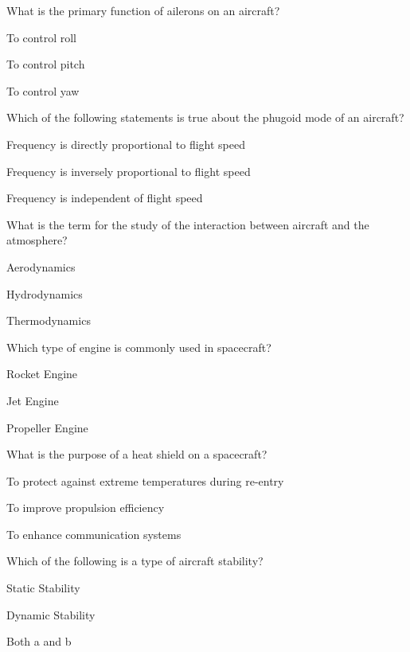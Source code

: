 \begin{enhancedmcq}{What is the primary function of ailerons on an aircraft?}
\item To control roll
\item To control pitch
\item To control yaw

\end{enhancedmcq}
\begin{enhancedmcq}{Which of the following statements is true about the phugoid mode of an aircraft?}
\item Frequency is directly proportional to flight speed
\item Frequency is inversely proportional to flight speed
\item Frequency is independent of flight speed

\end{enhancedmcq}
\begin{enhancedmcq}{What is the term for the study of the interaction between aircraft and the atmosphere?}
\item Aerodynamics
\item Hydrodynamics
\item Thermodynamics

\end{enhancedmcq}
\begin{enhancedmcq}{Which type of engine is commonly used in spacecraft?}
\item Rocket Engine
\item Jet Engine
\item Propeller Engine

\end{enhancedmcq}
\begin{enhancedmcq}{What is the purpose of a heat shield on a spacecraft?}
\item To protect against extreme temperatures during re-entry
\item To improve propulsion efficiency
\item To enhance communication systems

\end{enhancedmcq}
\begin{enhancedmcq}{Which of the following is a type of aircraft stability?}
\item Static Stability
\item Dynamic Stability
\item Both a and b

\end{enhancedmcq}
